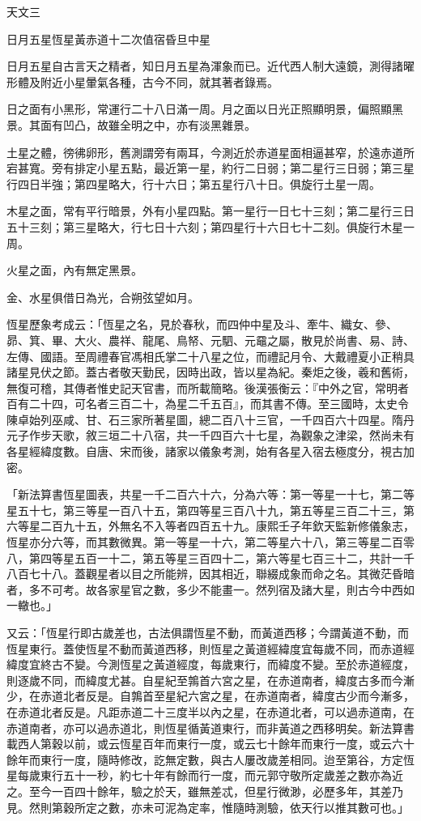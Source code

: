 
\begin{pinyinscope}
天文三

日月五星恆星黃赤道十二次值宿昏旦中星

日月五星自古言天之精者，知日月五星為渾象而已。近代西人制大遠鏡，測得諸曜形體及附近小星暈氣各種，古今不同，就其著者錄焉。

日之面有小黑形，常運行二十八日滿一周。月之面以日光正照顯明景，偏照顯黑景。其面有凹凸，故雖全明之中，亦有淡黑雜景。

土星之體，徬彿卵形，舊測謂旁有兩耳，今測近於赤道星面相逼甚窄，於遠赤道所宕甚寬。旁有排定小星五點，最近第一星，約行二日弱；第二星行三日弱；第三星行四日半強；第四星略大，行十六日；第五星行八十日。俱旋行土星一周。

木星之面，常有平行暗景，外有小星四點。第一星行一日七十三刻；第二星行三日五十三刻；第三星略大，行七日十六刻；第四星行十六日七十二刻。俱旋行木星一周。

火星之面，內有無定黑景。

金、水星俱借日為光，合朔弦望如月。

恆星歷象考成云：「恆星之名，見於春秋，而四仲中星及斗、牽牛、織女、參、昴、箕、畢、大火、農祥、龍尾、鳥帑、元駟、元黿之屬，散見於尚書、易、詩、左傳、國語。至周禮春官馮相氏掌二十八星之位，而禮記月令、大戴禮夏小正稍具諸星見伏之節。蓋古者敬天勤民，因時出政，皆以星為紀。秦炬之後，羲和舊術，無復可稽，其傳者惟史記天官書，而所載簡略。後漢張衡云：『中外之官，常明者百有二十四，可名者三百二十，為星二千五百』，而其書不傳。至三國時，太史令陳卓始列巫咸、甘、石三家所著星圖，總二百八十三官，一千四百六十四星。隋丹元子作步天歌，敘三垣二十八宿，共一千四百六十七星，為觀象之津梁，然尚未有各星經緯度數。自唐、宋而後，諸家以儀象考測，始有各星入宿去極度分，視古加密。

「新法算書恆星圖表，共星一千二百六十六，分為六等：第一等星一十七，第二等星五十七，第三等星一百八十五，第四等星三百八十九，第五等星三百二十三，第六等星二百九十五，外無名不入等者四百五十九。康熙壬子年欽天監新修儀象志，恆星亦分六等，而其數微異。第一等星一十六，第二等星六十八，第三等星二百零八，第四等星五百一十二，第五等星三百四十二，第六等星七百三十二，共計一千八百七十八。蓋觀星者以目之所能辨，因其相近，聯綴成象而命之名。其微茫昏暗者，多不可考。故各家星官之數，多少不能畫一。然列宿及諸大星，則古今中西如一轍也。」

又云：「恆星行即古歲差也，古法俱謂恆星不動，而黃道西移；今謂黃道不動，而恆星東行。蓋使恆星不動而黃道西移，則恆星之黃道經緯度宜每歲不同，而赤道經緯度宜終古不變。今測恆星之黃道經度，每歲東行，而緯度不變。至於赤道經度，則逐歲不同，而緯度尤甚。自星紀至鶉首六宮之星，在赤道南者，緯度古多而今漸少，在赤道北者反是。自鶉首至星紀六宮之星，在赤道南者，緯度古少而今漸多，在赤道北者反是。凡距赤道二十三度半以內之星，在赤道北者，可以過赤道南，在赤道南者，亦可以過赤道北，則恆星循黃道東行，而非黃道之西移明矣。新法算書載西人第穀以前，或云恆星百年而東行一度，或云七十餘年而東行一度，或云六十餘年而東行一度，隨時修改，訖無定數，與古人屢改歲差相同。迨至第谷，方定恆星每歲東行五十一秒，約七十年有餘而行一度，而元郭守敬所定歲差之數亦為近之。至今一百四十餘年，驗之於天，雖無差忒，但星行微渺，必歷多年，其差乃見。然則第穀所定之數，亦未可泥為定率，惟隨時測驗，依天行以推其數可也。」


\end{pinyinscope}
